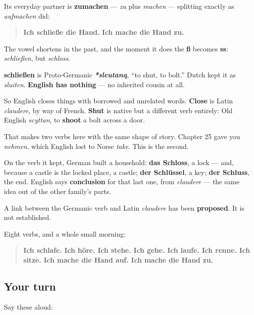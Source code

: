 Its everyday partner is \textbf{zumachen} — \emph{zu} plus \emph{machen} — splitting exactly as \emph{aufmachen} did:

\begin{quote}
\textbf{Ich schließe die Hand.} \textbf{Ich mache die Hand zu.}
\end{quote}

The vowel shortens in the past, and the moment it does the \textbf{ß} becomes \textbf{ss}: \emph{schließen}, but \emph{schloss}.

\begin{cousinweb}
\textbf{schließen} is Proto-Germanic \emph{\textbf{*sleutaną}}, \textquotedblleft{}to shut, to bolt.\textquotedblright{} Dutch kept it as \emph{sluiten}. \textbf{English has nothing} — no inherited cousin at all.

So English closes things with borrowed and unrelated words. \textbf{Close} is Latin \emph{claudere}, by way of French. \textbf{Shut} is native but a different verb entirely: Old English \emph{scyttan}, to \textbf{shoot} a bolt across a door.

That makes two verbs here with the same shape of story. Chapter 25 gave you \emph{nehmen}, which English lost to Norse \emph{take}. This is the second.

On the verb it kept, German built a household: \textbf{das Schloss}, a lock — and, because a castle is the locked place, a castle; \textbf{der Schlüssel}, a key; \textbf{der Schluss}, the end. English says \textbf{conclusion} for that last one, from \emph{claudere} — the same idea out of the other family's parts.

A link between the Germanic verb and Latin \emph{claudere} has been \textbf{proposed}. It is not established.
\end{cousinweb}

\begin{grammarlens}[title={What you've built across these two chapters}]
Eight verbs, and a whole small morning:

\begin{quote}
\textbf{Ich schlafe. Ich höre. Ich stehe. Ich gehe. Ich laufe. Ich renne. Ich sitze. Ich mache die Hand auf. Ich mache die Hand zu.}
\end{quote}
\end{grammarlens}

\subsection*{Your turn}
Say these aloud:

